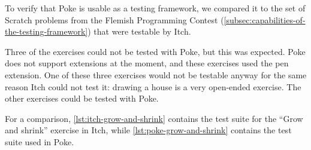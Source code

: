 \documentclass[../main]{subfiles}
\begin{document}
To verify that Poke is usable as a testing framework, we compared it to the set of Scratch problems from the Flemish Programming Contest (\cref{subsec:capabilities-of-the-testing-framework}) that were testable by Itch.

Three of the exercises could not be tested with Poke, but this was expected.
Poke does not support extensions at the moment, and these exercises used the pen extension.
One of these three exercises would not be testable anyway for the same reason Itch could not test it: drawing a house is a very open-ended exercise.
The other exercises could be tested with Poke.

For a comparison, \cref{lst:itch-grow-and-shrink} contains the test suite for the ``Grow and shrink'' exercise in Itch, while \cref{lst:poke-grow-and-shrink} contains the test suite used in Poke.
\end{document}

